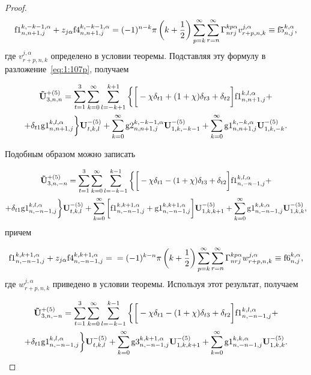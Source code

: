 \begin{proof}
\begin{equation*}
{\rm f1}_{n,n+1,j}^{k,-k-1,\alpha}+z_{j\alpha}{\rm f4}_{n,n+1,j}^{k,-k-1,\alpha}=(-1)^{n-k}\pi \left( {k + \frac{1}{2}} \right)\sum\limits_{p = k}^\infty  \sum\limits_{r = n}^\infty\Gamma _{nrj}^{kp\alpha }v_{r+p,n,k}^{j,\alpha}\equiv{\rm f5}_{n,j}^{k,\alpha},
\end{equation*}
где $v_{r+p,n,k}^{j,\alpha}$ определено в условии теоремы. Подставляя эту формулу в разложение~\eqref{eq:1:107p}, получаем

\begin{multline}
\mathbf{\tilde U}_{3,n,n}^{+(5)}=\sum\limits_{t=1}^3\sum\limits_{k=0}^\infty\sum\limits_{l=-k+1}^{k+1}\bigg\{\bigg\lbrack-\chi\delta_{t1}+(1+\chi)\delta_{t3}+\delta_{t2}\bigg\rbrack{\rm f1}_{n,n+1,j}^{k,l,\alpha}+ \\
+\delta_{t1}{\rm g1}_{n,n+1,j}^{k,l,\alpha}\bigg\}\mathbf{U}_{t,k,l}^{-(5)}+\sum\limits_{k=0}^\infty{\rm g2}_{n,n+1,j}^{k,-k-1,\alpha}\mathbf{U}_{1,k,-k-1}^{-(5)}+\sum\limits_{k=0}^\infty{\rm g1}_{n,n+1,j}^{k,-k,\alpha}\mathbf{U}_{1,k,-k}^{-(5)}.
\label{eq:1:109p}
\end{multline}

Подобным образом можно записать

\begin{multline}
\mathbf{\tilde U}_{3,n,-n}^{+(5)}=\sum\limits_{t=1}^3\sum\limits_{k=0}^\infty\sum\limits_{l=-k-1}^{k-1}\bigg\{\bigg\lbrack-\chi\delta_{t1}-(1+\chi)\delta_{t3}+\delta_{t2}\bigg\rbrack{\rm f1}_{n,-n-1,j}^{k,l,\alpha}+ \\
+\delta_{t1}{\rm g1}_{n,-n-1,j}^{k,l,\alpha}\bigg\}\mathbf{U}_{t,k,l}^{-(5)}+\sum\limits_{k=0}^\infty\bigg\lbrack{\rm f1}_{n,-n-1,j}^{k,k+1,\alpha}+{\rm g1}_{n,-n-1,j}^{k,k+1,\alpha}\bigg\rbrack\mathbf{U}_{1,k,k+1}^{-(5)}+\sum\limits_{k=0}^\infty{\rm g1}_{n,-n-1,j}^{k,k,\alpha}\mathbf{U}_{1,k,k}^{-(5)},
\label{eq:1:110p}
\end{multline}
причем

\begin{equation*}
{\rm f1}_{n,-n-1,j}^{k,k+1,\alpha}+z_{j\alpha}{\rm f4}_{n,-n-1,j}^{k,k+1,\alpha}= \\
=(-1)^{k-n}\pi\left( {k+\frac{1}{2}} \right)\sum\limits_{p = k}^\infty  \sum\limits_{r = n}^\infty\Gamma _{nrj}^{kp\alpha }w_{r+p,n,k}^{j,\alpha}\equiv{\rm f6}_{n,j}^{k,\alpha},
\end{equation*}
где $w_{r+p,n,k}^{j,\alpha}$ приведено в условии теоремы. Используя этот результат, получаем

\begin{multline}
\mathbf{\tilde U}_{3,n,-n}^{+(5)}=\sum\limits_{t=1}^3\sum\limits_{k=0}^\infty\sum\limits_{l=-k-1}^{k-1}\bigg\{\bigg\lbrack-\chi\delta_{t1}-(1+\chi)\delta_{t3}+\delta_{t2}\bigg\rbrack{\rm f1}_{n,-n-1,j}^{k,l,\alpha}+ \\
+\delta_{t1}{\rm g1}_{n,-n-1,j}^{k,l,\alpha}\bigg\}\mathbf{U}_{t,k,l}^{-(5)}+\sum\limits_{k=0}^\infty{\rm g3}_{n,-n-1,j}^{k,k+1,\alpha}\mathbf{U}_{1,k,k+1}^{-(5)}+\sum\limits_{k=0}^\infty{\rm g1}_{n,-n-1,j}^{k,k,\alpha}\mathbf{U}_{1,k,k}^{-(5)}.
\label{eq:1:111p}
\end{multline}


\end{proof}
